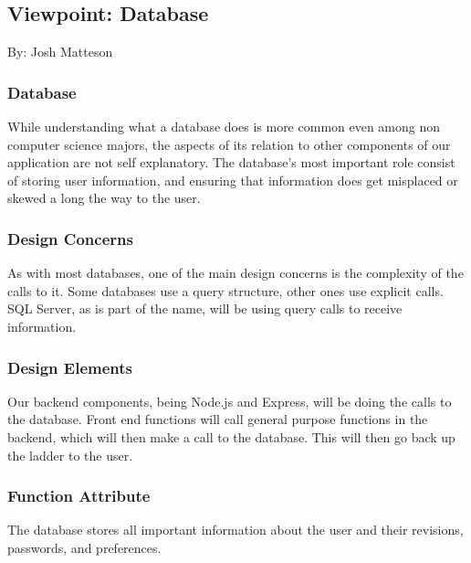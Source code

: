 \documentclass[letterpaper, 10pt, draftclsnofoot, compsoc, onecolumn]{IEEEtran}
\begin{document}
\newpage

\subsection{Viewpoint: Database}
{\noindent By: Josh Matteson \par}

\subsubsection{Database}
{\noindent While understanding what a database does is more common even among non computer science majors, the aspects of its relation
to other components of our application are not self explanatory. The database's most important role consist of storing user information,
and ensuring that information does get misplaced or skewed a long the way to the user. \par}

\subsubsection{Design Concerns}
{\noindent As with most databases, one of the main design concerns is the complexity of the calls to it. Some databases use a query structure,
other ones use explicit calls. SQL Server, as is part of the name, will be using query calls to receive information. \par}

\subsubsection{Design Elements}
{\noindent Our backend components, being Node.js and Express, will be doing the calls to the database. Front end functions will call general purpose
functions in the backend, which will then make a call to the database. This will then go back up the ladder to the user. \par}

\subsubsection{Function Attribute}
{\noindent The database stores all important information about the user and their revisions, passwords, and preferences. \par}
\end{document}
